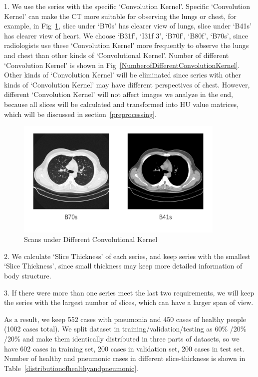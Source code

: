 \documentclass[runningheads]{llncs}
\begin{document}
1. We use the series with the specific `Convolution Kernel'. Specific `Convolution Kernel' can make the CT more suitable for observing the lungs or chest, for example, in Fig~\ref{Bs}, slice under `B70s' has clearer view of lungs, slice under `B41s' has clearer view of heart. We choose `B31f', `I31f 3', `B70f', `B80f', `B70s', since radiologists use these `Convolution Kernel'  more frequently to observe the lungs and chest than other kinds of `Convolutional Kernel'. Number of different `Convolution Kernel' is shown in Fig~\ref{NumberofDifferentConvolutionKernel}. Other kinds of `Convolution Kernel' will be eliminated since series with other kinds of `Convolution Kernel' may have different perspectives of chest.
However, different `Convolution Kernel' will not affect images we analyze in the end, because all slices will be calculated and transformed into HU value matrices, which will be discussed in section~\ref{preprocessing}.

\begin{figure}[t]
    \centerline{\includegraphics[width=100mm]{Bs.pdf}}
    \vspace{-0cm}
    \caption{Scans under Different Convolutional Kernel}
    \vspace{-0cm}
    \label{Bs}
    \end{figure}

2. We calculate `Slice Thickness' of each series, and keep series with the smallest `Slice Thickness', since small thickness may keep more detailed information of body structure. 

3. If there were more than one series meet the last two requirements, we will keep the series with the largest number of slices, which can have a larger span of view.

As a result, we keep 552 cases with pneumonia and 450 cases of healthy people (1002 cases total).
We split dataset in training/validation/testing as 60\% /20\% /20\% and make them identically distributed in three parts of datasets, so we have 602 cases in training set, 200 cases in validation set, 200 cases in test set.
Number of healthy and pneumonic cases in different slice-thickness is shown in Table~\ref{distributionofhealthyandpneumonic}.
\end{document}
